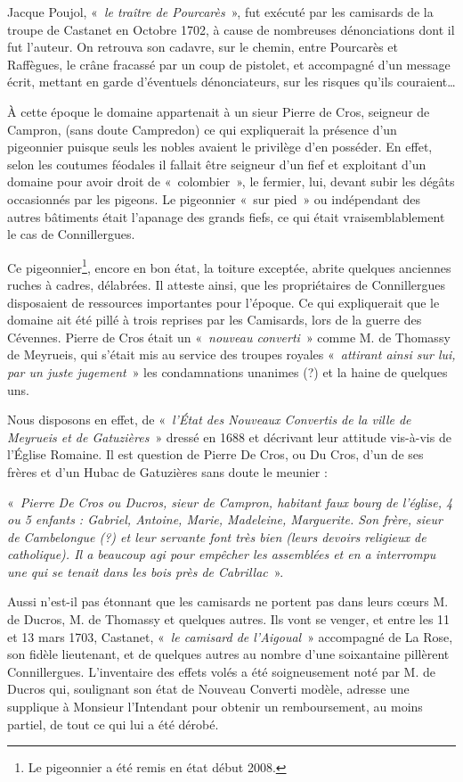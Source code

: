 Jacque Poujol, «~\textit{le traître de Pourcarès}~», fut exécuté par les camisards de la troupe de
Castanet en Octobre 1702, à cause de nombreuses dénonciations dont il fut l’auteur. On
retrouva son cadavre, sur le chemin, entre Pourcarès et Raffègues, le crâne fracassé par un
coup de pistolet, et accompagné d’un message écrit, mettant en garde d’éventuels
dénonciateurs, sur les risques qu’ils couraient…

À cette époque le domaine appartenait à un sieur Pierre de Cros, seigneur de Campron, (sans
doute Campredon) ce qui expliquerait la présence d’un pigeonnier puisque seuls les nobles
avaient le privilège d’en posséder. En effet, selon les coutumes féodales il fallait être seigneur
d’un fief et exploitant d’un domaine pour avoir droit de «~colombier~», le fermier, lui, devant
subir les dégâts occasionnés par les pigeons. Le pigeonnier «~sur pied~» ou indépendant des
autres bâtiments était l’apanage des grands fiefs, ce qui était vraisemblablement le cas de
Connillergues.

Ce pigeonnier\footnote{Le pigeonnier a été remis en état début 2008.}, encore en bon état, la toiture exceptée, abrite quelques anciennes ruches à
cadres, délabrées. Il atteste ainsi, que les propriétaires de Connillergues disposaient de
ressources importantes pour l’époque. Ce qui expliquerait que le domaine ait été pillé à trois
reprises par les Camisards, lors de la guerre des Cévennes. Pierre de Cros était un «~\textit{nouveau
converti}~» comme M. de Thomassy de Meyrueis, qui s’était mis au service des troupes royales
«~\textit{attirant ainsi sur lui, par un juste jugement}~» les condamnations unanimes (?) et la haine de
quelques uns.

Nous disposons en effet, de «~\textit{l’État des Nouveaux Convertis de la ville de Meyrueis et de
Gatuzières}~» dressé en 1688 et décrivant leur attitude vis-à-vis de l’Église Romaine. Il est
question de Pierre De Cros, ou Du Cros, d’un de ses frères et d’un Hubac de Gatuzières sans
doute le meunier :

«~\textit{Pierre De Cros ou Ducros, sieur de Campron, habitant faux bourg de l’église, 4 ou 5
enfants : Gabriel, Antoine, Marie, Madeleine, Marguerite. Son frère, sieur de Cambelongue
(?) et leur servante font très bien (leurs devoirs religieux de catholique). Il a beaucoup agi
pour empêcher les assemblées et en a interrompu une qui se tenait dans les bois près de
Cabrillac}~».

Aussi n’est-il pas étonnant que les camisards ne portent pas dans leurs cœurs M. de Ducros,
M. de Thomassy et quelques autres. Ils vont se venger, et entre les 11 et 13 mars 1703,
Castanet, «~\textit{le camisard de l’Aigoual}~» accompagné de La Rose, son fidèle lieutenant, et de
quelques autres au nombre d’une soixantaine pillèrent Connillergues. L’inventaire des effets
volés a été soigneusement noté par M. de Ducros qui, soulignant son état de Nouveau
Converti modèle, adresse une supplique à Monsieur l’Intendant pour obtenir un
remboursement, au moins partiel, de tout ce qui lui a été dérobé.

